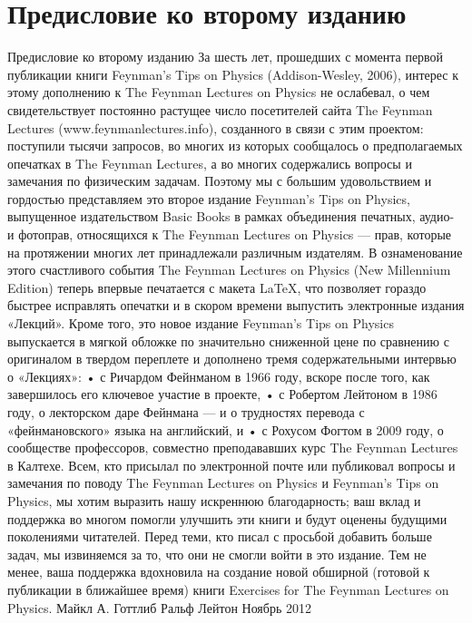 \documentclass[10pt,oneside]{article}
\begin{document}
\section*{Предисловие ко второму изданию}
\label{tips-sec-1-предисловие-ко-второму-изданию}
Предисловие ко второму изданию За шесть лет, прошедших с момента первой публикации книги Feynman’s Tips on Physics (Addison-Wesley, 2006), интерес к этому дополнению к The Feynman Lectures on Physics не ослабевал, о чем свидетельствует постоянно растущее число посетителей сайта The Feynman Lectures (www.feynmanlectures.info), созданного в связи с этим проектом: поступили тысячи запросов, во многих из которых сообщалось о предполагаемых опечатках в The Feynman Lectures, а во многих содержались вопросы и замечания по физическим задачам. Поэтому мы с большим удовольствием и гордостью представляем это второе издание Feynman’s Tips on Physics, выпущенное издательством Basic Books в рамках объединения печатных, аудио- и фотоправ, относящихся к The Feynman Lectures on Physics --- прав, которые на протяжении многих лет принадлежали различным издателям. В ознаменование этого счастливого события The Feynman Lectures on Physics (New Millennium Edition) теперь впервые печатается с макета LaTeX, что позволяет гораздо быстрее исправлять опечатки и в скором времени выпустить электронные издания «Лекций». Кроме того, это новое издание Feynman’s Tips on Physics выпускается в мягкой обложке по значительно сниженной цене по сравнению с оригиналом в твердом переплете и дополнено тремя содержательными интервью о «Лекциях»: • с Ричардом Фейнманом в 1966 году, вскоре после того, как завершилось его ключевое участие в проекте, • с Робертом Лейтоном в 1986 году, о лекторском даре Фейнмана --- и о трудностях перевода с «фейнмановского» языка на английский, и • с Рохусом Фогтом в 2009 году, о сообществе профессоров, совместно преподававших курс The Feynman Lectures в Калтехе. Всем, кто присылал по электронной почте или публиковал вопросы и замечания по поводу The Feynman Lectures on Physics и Feynman’s Tips on Physics, мы хотим выразить нашу искреннюю благодарность; ваш вклад и поддержка во многом помогли улучшить эти книги и будут оценены будущими поколениями читателей. Перед теми, кто писал с просьбой добавить больше задач, мы извиняемся за то, что они не смогли войти в это издание. Тем не менее, ваша поддержка вдохновила на создание новой обширной (готовой к публикации в ближайшее время) книги Exercises for The Feynman Lectures on Physics. Майкл А. Готтлиб Ральф Лейтон Ноябрь 2012\par
\end{document}
